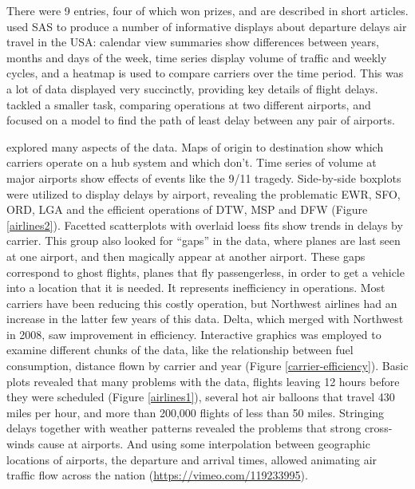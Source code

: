 \documentclass{article}
\begin{document}
There were 9 entries, four of which won prizes, and are described in short articles. \citet{expo-wicklin} used SAS to produce a number of informative displays about departure delays air travel in the USA: calendar view summaries show differences between years, months and days of the week, time series display volume of traffic and weekly cycles, and a heatmap is used to compare carriers over the time period. This was a lot of data displayed very succinctly, providing key details of flight delays. \citet{expo-wickham} tackled a smaller task, comparing operations at two different airports, and \citet{expo-dey} focused on a model to find the path of least delay between any pair of airports.

\citet{expo-hofmann} explored many aspects of the data. Maps of origin to destination show which carriers operate on a hub system and which don't. Time series of volume at major airports show effects of events like the 9/11 tragedy. Side-by-side boxplots were utilized to display delays by airport, revealing the problematic EWR, SFO, ORD, LGA and the efficient operations of DTW, MSP and DFW (Figure \ref{airlines2}). Facetted scatterplots with overlaid loess fits show trends in delays by carrier. This group also looked for ``gaps'' in the data, where planes are last seen at one airport, and then magically appear at another airport. These gaps correspond to ghost flights, planes that fly passengerless, in order to get a vehicle into a location that it is needed. It represents inefficiency in operations. Most carriers have been reducing this costly operation, but Northwest airlines had an increase in the latter few years of this data. Delta, which merged with Northwest in 2008, saw improvement in efficiency. Interactive graphics was employed to examine different chunks of the data, like the relationship between fuel consumption, distance flown by carrier and year (Figure \ref{carrier-efficiency}). Basic plots revealed that many problems with the data, flights leaving 12 hours before they were scheduled (Figure \ref{airlines1}), several hot air balloons that travel 430 miles per hour, and more than 200,000 flights of less than 50 miles. Stringing delays together with weather patterns revealed the problems that strong cross-winds cause at airports. And using some interpolation between geographic locations of airports, the departure and arrival times, allowed animating air traffic flow across the nation (\url{https://vimeo.com/119233995}).
\end{document}
